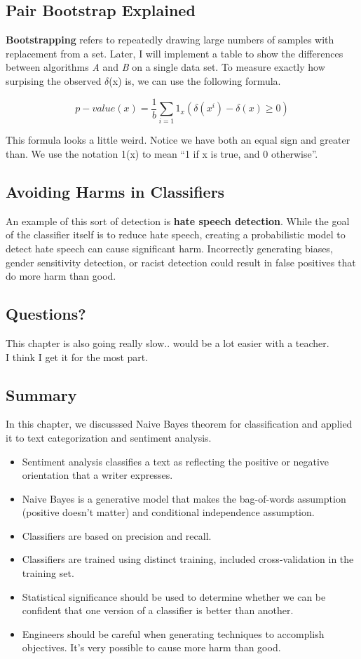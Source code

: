 \documentclass{article}
\begin{document}
\subsection{Pair Bootstrap Explained}
\textbf{Bootstrapping} refers to repeatedly drawing large numbers of samples with replacement from a set. Later, I will implement a table to show the differences between algorithms \textit{A} and
\textit{B} on a single data set. To measure exactly how surpising the observed $\delta$(x) is, we can use the following formula.

\[
    p-value(x) = \frac{1}{b}\sum_{i=1} 1_x (\delta(x^i)-\delta(x) \geq 0)
\]



This formula looks a little weird. Notice we have both an equal sign and greater than. We use the notation 1(x) to mean “1 if x is true, and 0 otherwise”.

\subsection{Avoiding Harms in Classifiers}

An example of this sort of detection is \textbf{hate speech detection}. While the goal of the classifier itself is to reduce hate speech, creating
a probabilistic model to detect hate speech can cause significant harm. Incorrectly generating biases,
gender sensitivity detection, or racist detection could result in false positives that do more harm than good.



\subsection{Questions?}
This chapter is also going really slow.. would be a lot easier with a teacher.
\\ I think I get it for the most part.

\subsection{Summary}
In this chapter, we discusssed Naive Bayes theorem for classification and applied it to text categorization and sentiment analysis.
\begin{itemize}
    \item Sentiment analysis classifies a text as reflecting the positive or negative orientation that a writer expresses.
    \item Naive Bayes is a generative model that makes the bag-of-words assumption (positive doesn't matter) and conditional independence assumption.
    \item Classifiers are based on precision and recall.
    \item Classifiers are trained using distinct training, included cross-validation in the training set.
    \item Statistical significance should be used to determine whether we can be confident that one version of a classifier is better than another.
    \item Engineers should be careful when generating techniques to accomplish objectives. It's very possible to cause more harm than good.
\end{itemize}
\end{document}
